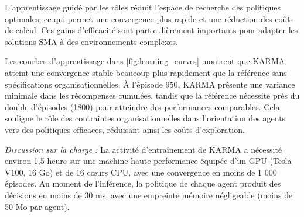 \begin{table}[h]
  \centering
  \caption{Efficacité de la génération de SMA dans tous les scénarios.}
  \label{tab:mas_generation_efficiency}
\end{table}

L'apprentissage guidé par les rôles réduit l'espace de recherche des politiques optimales, ce qui permet une convergence plus rapide et une réduction des coûts de calcul. Ces gains d'efficacité sont particulièrement importants pour adapter les solutions SMA à des environnements complexes.

Les courbes d'apprentissage dans \autoref{fig:learning_curves} montrent que KARMA atteint une convergence stable beaucoup plus rapidement que la référence sans spécifications organisationnelles. À l'épisode 950, KARMA présente une variance minimale dans les récompenses cumulées, tandis que la référence nécessite près du double d'épisodes (1800) pour atteindre des performances comparables. Cela souligne le rôle des contraintes organisationnelles dans l'orientation des agents vers des politiques efficaces, réduisant ainsi les coûts d'exploration.

\noindent \textit{Discussion sur la charge :} La activité d'entraînement de KARMA a nécessité environ 1,5 heure sur une machine haute performance équipée d'un GPU (Tesla V100, 16 Go) et de 16 cœurs CPU, avec une convergence en moins de 1 000 épisodes. Au moment de l'inférence, la politique de chaque agent produit des décisions en moins de 30 ms, avec une empreinte mémoire négligeable (moins de 50 Mo par agent).

